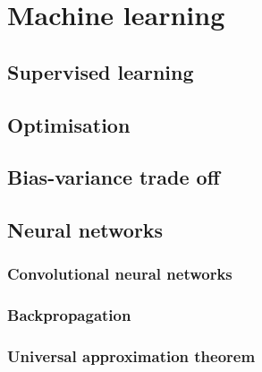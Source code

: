 \chapter{Machine learning}
\label{chap:ml}

\section{Supervised learning}

\section{Optimisation}
\section{Bias-variance trade off}
\section{Neural networks}

\subsection{Convolutional neural networks}

\subsection{Backpropagation}
\subsection{Universal approximation theorem}